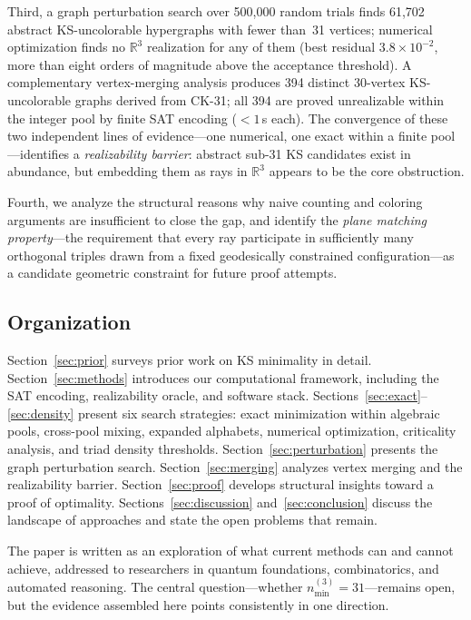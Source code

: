 \documentclass[twocolumn,pra,superscriptaddress,nofootinbib]{revtex4-2}
\newcommand{\R}{\mathbb{R}}
\begin{document}
Third, a graph perturbation search over 500,000 random trials finds 61,702
abstract KS-uncolorable hypergraphs with fewer than~31 vertices; numerical
optimization finds no $\R^3$ realization for any of them (best residual
$3.8 \times 10^{-2}$, more than eight orders of magnitude above the acceptance threshold).
A complementary vertex-merging analysis produces 394 distinct 30-vertex
KS-uncolorable graphs derived from CK-31; all 394 are proved unrealizable
within the integer pool by finite SAT encoding ($< 1$\,s each).
The convergence of these two independent lines of evidence---one numerical,
one exact within a finite pool---identifies a \emph{realizability barrier}:
abstract sub-31 KS candidates exist in abundance, but embedding them as
rays in $\R^3$ appears to be the core obstruction.

Fourth, we analyze the structural reasons why naive counting and coloring
arguments are insufficient to close the gap, and identify the \emph{plane
matching property}---the requirement that every ray participate in sufficiently
many orthogonal triples drawn from a fixed geodesically constrained
configuration---as a candidate geometric constraint for future proof attempts.

\subsection*{Organization}

Section~\ref{sec:prior} surveys prior work on KS minimality in detail.
Section~\ref{sec:methods} introduces our computational framework, including
the SAT encoding, realizability oracle, and software stack.
Sections~\ref{sec:exact}--\ref{sec:density} present six search strategies:
exact minimization within algebraic pools, cross-pool mixing, expanded alphabets,
numerical optimization, criticality analysis, and triad density thresholds.
Section~\ref{sec:perturbation} presents the graph perturbation search.
Section~\ref{sec:merging} analyzes vertex merging and the realizability barrier.
Section~\ref{sec:proof} develops structural insights toward a proof of optimality.
Sections~\ref{sec:discussion} and~\ref{sec:conclusion} discuss the landscape of
approaches and state the open problems that remain.

The paper is written as an exploration of what current methods can and cannot
achieve, addressed to researchers in quantum foundations, combinatorics, and
automated reasoning. The central question---whether $n_{\min}^{(3)} = 31$---remains
open, but the evidence assembled here points consistently in one direction.
\end{document}
